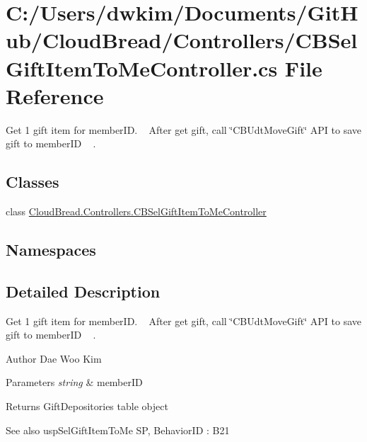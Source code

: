 \hypertarget{a00144}{}\section{C\+:/\+Users/dwkim/\+Documents/\+Git\+Hub/\+Cloud\+Bread/\+Controllers/\+C\+B\+Sel\+Gift\+Item\+To\+Me\+Controller.cs File Reference}
\label{a00144}


Get 1 gift item for member\+ID. ~\newline
After get gift, call \char`\"{}\+C\+B\+Udt\+Move\+Gift\char`\"{} A\+PI to save gift to member\+ID ~\newline
.  


\subsection*{Classes}
\begin{DoxyCompactItemize}
\item 
class \hyperlink{a00032}{Cloud\+Bread.\+Controllers.\+C\+B\+Sel\+Gift\+Item\+To\+Me\+Controller}
\end{DoxyCompactItemize}
\subsection*{Namespaces}
\begin{DoxyCompactItemize}
\end{DoxyCompactItemize}


\subsection{Detailed Description}
Get 1 gift item for member\+ID. ~\newline
After get gift, call \char`\"{}\+C\+B\+Udt\+Move\+Gift\char`\"{} A\+PI to save gift to member\+ID ~\newline
. 

\begin{DoxyAuthor}{Author}
Dae Woo Kim 
\end{DoxyAuthor}

\begin{DoxyParams}{Parameters}
{\em string} & member\+ID \\
\hline
\end{DoxyParams}
\begin{DoxyReturn}{Returns}
Gift\+Depositories table object 
\end{DoxyReturn}
\begin{DoxySeeAlso}{See also}
usp\+Sel\+Gift\+Item\+To\+Me SP, Behavior\+ID \+: B21 
\end{DoxySeeAlso}
